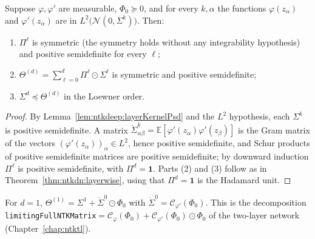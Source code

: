 \begin{theorem}\label{thm:ntkdn:limitProps}
  \leanok
Suppose $\varphi,\varphi'$ are measurable, $\Phi_0\succeq0$, and for every $k,\alpha$ the functions $\varphi(z_\alpha)$ and $\varphi'(z_\alpha)$ are in $L^2\bigl(\mathcal N(0,\Sigma^k)\bigr)$. Then:
\begin{enumerate}
  \item $\Pi^\ell$ is symmetric (the symmetry holds without any integrability hypothesis) and positive semidefinite for every $\ell$;
  \item $\Theta^{(d)}=\sum_{\ell=0}^d\Pi^\ell\odot\Sigma^\ell$ is symmetric and positive semidefinite;
  \item $\Sigma^d\preceq\Theta^{(d)}$ in the Loewner order.
\end{enumerate}
\end{theorem}

\begin{proof}
  \leanok
By Lemma~\ref{lem:ntkdeep:layerKernelPsd} and the $L^2$ hypothesis, each $\Sigma^k$ is positive semidefinite. A matrix $\dot\Sigma^k_{\alpha\beta}=\mathbb E[\varphi'(z_\alpha)\varphi'(z_\beta)]$ is the Gram matrix of the vectors $(\varphi'(z_\alpha))_\alpha\in L^2$, hence positive semidefinite, and Schur products of positive semidefinite matrices are positive semidefinite; by downward induction $\Pi^\ell$ is positive semidefinite, with $\Pi^d=\mathbf 1$. Parts (2) and (3) follow as in Theorem~\ref{thm:ntkdn:layerwise}, using that $\Pi^d=\mathbf 1$ is the Hadamard unit.
\end{proof}

\begin{theorem}\label{thm:ntkdn:twoLayer}
  \leanok
For $d=1$, $\Theta^{(1)}=\Sigma^1+\dot\Sigma^0\odot\Phi_0$ with $\dot\Sigma^0=\mathcal C_{\varphi'}(\Phi_0)$. This is the decomposition \texttt{limitingFullNTKMatrix}$=\mathcal C_\varphi(\Phi_0)+\mathcal C_{\varphi'}(\Phi_0)\odot\Phi_0$ of the two-layer network (Chapter~\ref{chap:ntktl}).
\end{theorem}


